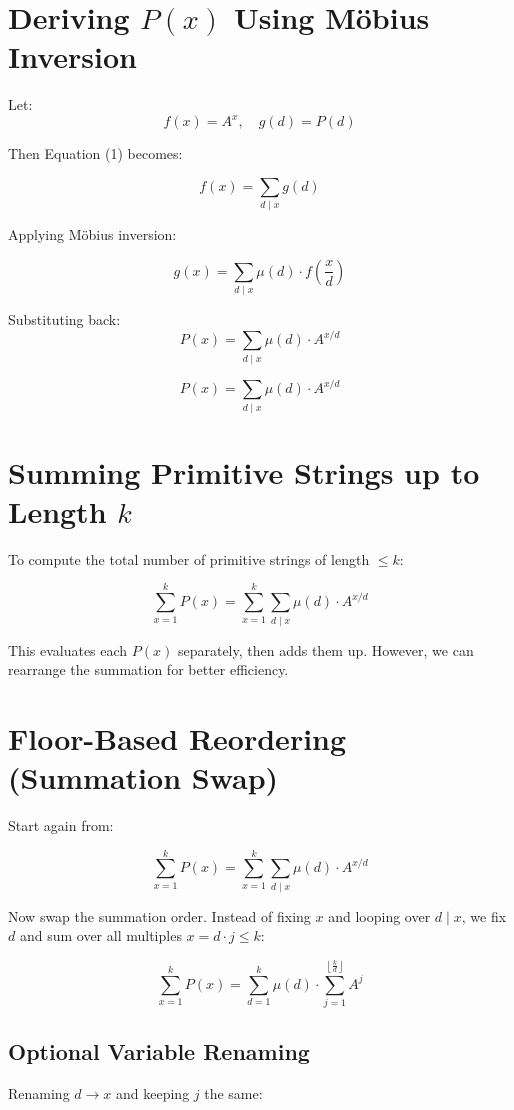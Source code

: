\documentclass[12pt]{article}
\begin{document}
\section*{Deriving $P(x)$ Using Möbius Inversion}

Let:
\[
f(x) = A^x, \quad g(d) = P(d)
\]

Then Equation (1) becomes:

\[
f(x) = \sum_{d \mid x} g(d)
\]

Applying Möbius inversion:

\[
g(x) = \sum_{d \mid x} \mu(d) \cdot f\left( \frac{x}{d} \right)
\]

Substituting back:
\[
P(x) = \sum_{d \mid x} \mu(d) \cdot A^{x/d}
\]

\[
\boxed{
P(x) = \sum_{d \mid x} \mu(d) \cdot A^{x/d}
}
\]

\section*{Summing Primitive Strings up to Length $k$}

To compute the total number of primitive strings of length $\le k$:

\[
\sum_{x=1}^{k} P(x) = \sum_{x=1}^{k} \sum_{d \mid x} \mu(d) \cdot A^{x/d}
\]

This evaluates each $P(x)$ separately, then adds them up.  
However, we can rearrange the summation for better efficiency.

\section*{Floor-Based Reordering (Summation Swap)}

Start again from:

\[
\sum_{x=1}^{k} P(x) = \sum_{x=1}^{k} \sum_{d \mid x} \mu(d) \cdot A^{x/d}
\]

Now swap the summation order.  
Instead of fixing $x$ and looping over $d \mid x$, we fix $d$ and sum over all multiples $x = d \cdot j \le k$:

\[
\sum_{x=1}^{k} P(x) = \sum_{d=1}^{k} \mu(d) \cdot \sum_{j=1}^{\left\lfloor \frac{k}{d} \right\rfloor} A^j
\]

\subsection*{Optional Variable Renaming}

Renaming $d \rightarrow x$ and keeping $j$ the same:
\end{document}
